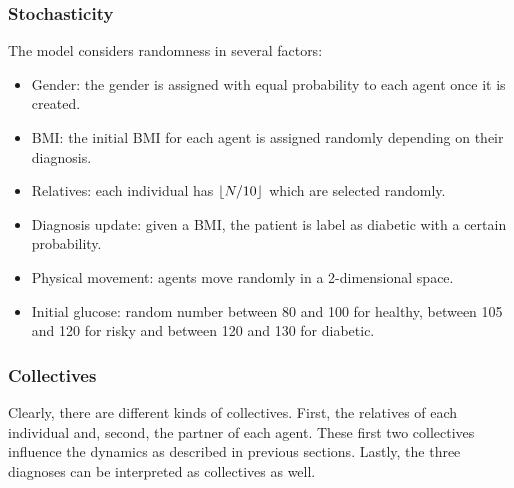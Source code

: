  \subsubsection{Stochasticity}
 The model considers randomness in several factors: 
 \begin{itemize}
     \item Gender: the gender is assigned with equal probability to each agent once it is created.
     \item BMI: the initial BMI for each agent is assigned randomly depending on their diagnosis.
     \item Relatives: each individual has $\lfloor N/10\rfloor$ which are selected randomly.
     \item Diagnosis update: given a BMI, the patient is label as diabetic with a certain probability.
     \item Physical movement: agents move randomly in a 2-dimensional space.
     \item Initial glucose: random number between 80 and 100 for healthy, between 105 and 120 for risky and between 120 and 130 for diabetic.
 \end{itemize}
 
 \subsubsection{\hspace{0.2cm}Collectives}
 Clearly, there are different kinds of collectives. First, the relatives of each individual and, second, the partner of each agent. These first two collectives influence the dynamics as described in previous sections. Lastly, the three diagnoses can be interpreted as collectives as well.

